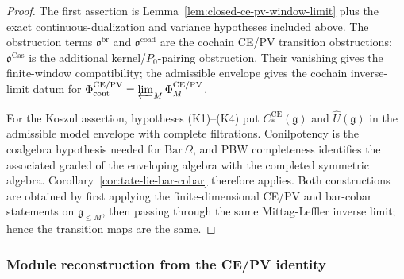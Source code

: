 \begin{proof}
  The first assertion is Lemma~\ref{lem:closed-ce-pv-window-limit} plus the
  exact continuous-dualization and variance hypotheses included above.
  The obstruction terms \(\mathfrak o^{\mathrm{br}}\) and
  \(\mathfrak o^{\mathrm{coad}}\) are the cochain CE/PV transition
  obstructions; \(\mathfrak o^{\mathrm{Cas}}\) is the additional
  kernel/\(P_0\)-pairing obstruction.  Their vanishing gives the
  finite-window compatibility; the admissible envelope gives the
  cochain inverse-limit datum for
  \(\Phi^{\mathrm{CE/PV}}_{\mathrm{cont}}
    =\varprojlim_M\Phi_M^{\mathrm{CE/PV}}\).

  For the Koszul assertion, hypotheses (K1)--(K4) put
  \(C_*^{\mathrm{CE}}(\mathfrak g)\) and
  \(\widehat U(\mathfrak g)\) in the admissible model envelope with
  complete filtrations.  Conilpotency is the coalgebra hypothesis
  needed for \(\mathrm{Bar}\,\Omega\), and PBW completeness identifies
  the associated graded of the enveloping algebra with the completed
  symmetric algebra.  Corollary~\ref{cor:tate-lie-bar-cobar} therefore
  applies.  Both constructions are obtained by first applying the
  finite-dimensional CE/PV and bar-cobar statements on
  \(\mathfrak g_{\leq M}\), then passing through the same
  Mittag-Leffler inverse limit; hence the transition maps are the same.
\end{proof}

\subsubsection{Module reconstruction from the CE/PV identity}

